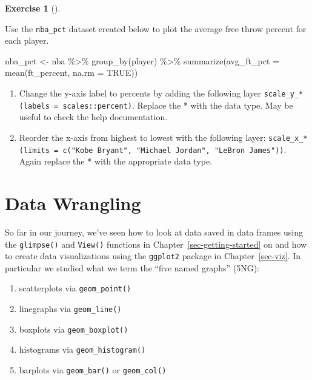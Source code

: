 \documentclass[
  letterpaper,
  DIV=11,
  numbers=noendperiod]{scrreprt}
\newenvironment{Shaded}{\begin{snugshade}}{\end{snugshade}}
\newcommand{\AttributeTok}[1]{\textcolor[rgb]{0.40,0.45,0.13}{#1}}
\newcommand{\ConstantTok}[1]{\textcolor[rgb]{0.56,0.35,0.01}{#1}}
\newcommand{\FunctionTok}[1]{\textcolor[rgb]{0.28,0.35,0.67}{#1}}
\newcommand{\NormalTok}[1]{\textcolor[rgb]{0.00,0.23,0.31}{#1}}
\newcommand{\OtherTok}[1]{\textcolor[rgb]{0.00,0.23,0.31}{#1}}
\newcommand{\SpecialCharTok}[1]{\textcolor[rgb]{0.37,0.37,0.37}{#1}}
\providecommand{\tightlist}{%
  \setlength{\itemsep}{0pt}\setlength{\parskip}{0pt}}\usepackage{longtable,booktabs,array}
\theoremstyle{definition}
\newtheorem{exercise}{Exercise}[chapter]
\theoremstyle{remark}
\begin{document}
\begin{exercise}[]\protect\hypertarget{exr-ch02-adv2}{}\label{exr-ch02-adv2}

Use the \texttt{nba\_pct} dataset created below to plot the average free
throw percent for each player.

\begin{Shaded}
\begin{Highlighting}[]
\NormalTok{nba\_pct }\OtherTok{\textless{}{-}}\NormalTok{ nba }\SpecialCharTok{\%\textgreater{}\%} 
    \FunctionTok{group\_by}\NormalTok{(player) }\SpecialCharTok{\%\textgreater{}\%}
    \FunctionTok{summarize}\NormalTok{(}\AttributeTok{avg\_ft\_pct =} \FunctionTok{mean}\NormalTok{(ft\_percent, }\AttributeTok{na.rm =} \ConstantTok{TRUE}\NormalTok{))}
\end{Highlighting}
\end{Shaded}

\begin{enumerate}
\def\labelenumi{\alph{enumi})}
\tightlist
\item
  Change the y-axis label to percents by adding the following layer
  \texttt{scale\_y\_*(labels\ =\ scales::percent)}. Replace the * with
  the data type. May be useful to check the help documentation.
\item
  Reorder the x-axis from highest to lowest with the following layer:
  \texttt{scale\_x\_*(limits\ =\ c("Kobe\ Bryant",\ "Michael\ Jordan",\ "LeBron\ James"))}.
  Again replace the * with the appropriate data type.
\end{enumerate}

\end{exercise}

\hypertarget{sec-wrangling}{%
\chapter{Data Wrangling}\label{sec-wrangling}}

So far in our journey, we've seen how to look at data saved in data
frames using the \texttt{glimpse()} and \texttt{View()} functions in
Chapter~\ref{sec-getting-started} on and how to create data
visualizations using the \texttt{ggplot2} package in
Chapter~\ref{sec-viz}. In particular we studied what we term the ``five
named graphs'' (5NG):

\begin{enumerate}
\def\labelenumi{\arabic{enumi}.}
\tightlist
\item
  scatterplots via \texttt{geom\_point()}
\item
  linegraphs via \texttt{geom\_line()}
\item
  boxplots via \texttt{geom\_boxplot()}
\item
  histograms via \texttt{geom\_histogram()}
\item
  barplots via \texttt{geom\_bar()} or \texttt{geom\_col()}
\end{enumerate}
\end{document}

